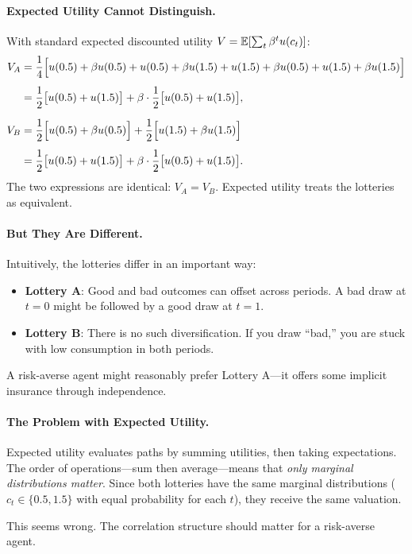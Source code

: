\paragraph{Expected Utility Cannot Distinguish.}
With standard expected discounted utility $V = \mathbb{E}[\sum_t \beta^t u(c_t)]$:
\begin{align}
V_A &= \frac{1}{4}\Big[ u(0.5) + \beta u(0.5) + u(0.5) + \beta u(1.5) + u(1.5) + \beta u(0.5) + u(1.5) + \beta u(1.5) \Big] \notag \\[4pt]
&= \frac{1}{2}\big[ u(0.5) + u(1.5) \big] + \beta \cdot \frac{1}{2}\big[ u(0.5) + u(1.5) \big], \\[6pt]
V_B &= \frac{1}{2}\Big[ u(0.5) + \beta u(0.5) \Big] + \frac{1}{2}\Big[ u(1.5) + \beta u(1.5) \Big] \notag \\[4pt]
&= \frac{1}{2}\big[ u(0.5) + u(1.5) \big] + \beta \cdot \frac{1}{2}\big[ u(0.5) + u(1.5) \big].
\end{align}
The two expressions are identical: $V_A = V_B$. Expected utility treats the lotteries as equivalent.

\paragraph{But They Are Different.}
Intuitively, the lotteries differ in an important way:
\begin{itemize}[leftmargin=2em]
    \item \textbf{Lottery A}: Good and bad outcomes can offset across periods. A bad draw at $t=0$ might be followed by a good draw at $t=1$.
    \item \textbf{Lottery B}: There is no such diversification. If you draw ``bad,'' you are stuck with low consumption in both periods.
\end{itemize}
A risk-averse agent might reasonably prefer Lottery A---it offers some implicit insurance through independence.

\paragraph{The Problem with Expected Utility.}
Expected utility evaluates paths by summing utilities, then taking expectations. The order of operations---sum then average---means that \emph{only marginal distributions matter}. Since both lotteries have the same marginal distributions ($c_t \in \{0.5, 1.5\}$ with equal probability for each $t$), they receive the same valuation.

This seems wrong. The correlation structure should matter for a risk-averse agent.

